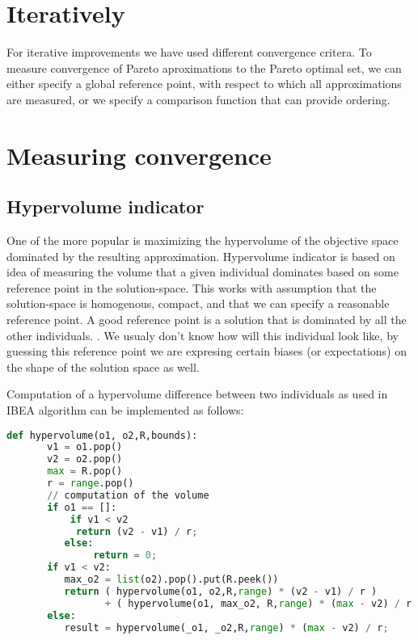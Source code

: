 \documentclass[12pt,oneside]{fithesis2}
\begin{document}
\section{Iteratively}

For iterative improvements we have used different convergence critera. To measure convergence of Pareto aproximations to the Pareto optimal set, we can either specify a global reference point, with respect to which all approximations are measured, or we specify a comparison function that can provide ordering.

\section{Measuring convergence}

\subsection{Hypervolume indicator}
One of the more popular is maximizing the hypervolume of the objective space dominated by the resulting approximation. Hypervolume indicator is based on idea of measuring the volume that a given individual dominates based on some reference point in the solution-space. This works with assumption that the solution-space is homogenous, compact, and that we can specify a reasonable reference point. A good reference point is a solution that is dominated by all the other individuals. \cite{auger2009theory}. We usualy don't know how will this individual look like, by guessing this reference point we are expresing certain biases (or expectations) on the shape of the solution space as well.

Computation of a hypervolume difference between two individuals as used in IBEA algorithm can be implemented as follows:
\begin{lstlisting}[language=Python,label=hv_example,caption=Hypervolume implementation]
def hypervolume(o1, o2,R,bounds):
       v1 = o1.pop()
       v2 = o2.pop()
       max = R.pop()
       r = range.pop()
       // computation of the volume
       if o1 == []:
           if v1 < v2
            return (v2 - v1) / r;
          else:
               return = 0;
       if v1 < v2:
          max_o2 = list(o2).pop().put(R.peek())
          return ( hypervolume(o1, o2,R,range) * (v2 - v1) / r ) 
                 + ( hypervolume(o1, max_o2, R,range) * (max - v2) / r );
       else:
          result = hypervolume(_o1, _o2,R,range) * (max - v2) / r;
\end{lstlisting}
\end{document}
